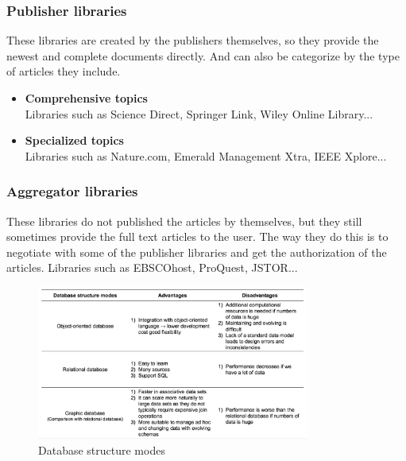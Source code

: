 \subsubsection*{Publisher libraries}
	These libraries are created by the publishers themselves, so they provide the newest and complete documents directly. And can also be categorize by the type of articles they include.
	\begin{itemize}
		\item\textbf{Comprehensive topics}\\Libraries such as Science Direct, Springer Link, Wiley Online Library...
		\item\textbf{Specialized topics}\\Libraries such as Nature.com, Emerald Management Xtra, IEEE Xplore...
	\end{itemize}
\subsubsection*{Aggregator libraries}
	These libraries do not published the articles by themselves, but they still sometimes provide the full text articles to the user. The way they do this is to negotiate with some of the publisher libraries and get the authorization of the articles. Libraries such as EBSCOhost, ProQuest, JSTOR...


\begin{figure}
	\begin{center}
		\includegraphics[width=0.8\textwidth]{WolverineChart2}
	\end{center}
	\caption{Database structure modes}
\end{figure}
\clearpage
